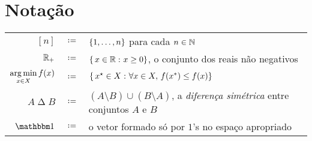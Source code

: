 \documentclass[10pt,reqno]{amsart}
\begin{document}
\appendix

\section{Notação}

\bgroup
\renewcommand{\arraystretch}{1.2}
\begin{table}[!ht]
  \centering
  \begin{tabular}{r c p{12cm} }
    \toprule
    \([n]\)
    & \(\coloneqq\) &
    \(\{1,\dotsc,n\}\) para cada \(n \in \mathbb{N}\)
    \\
    \(\mathbb{R}_+\)
    & \(\coloneqq\) &
    \(\{\,{x \in \mathbb{R}}\,\colon{x \geq 0}\}\), o conjunto dos reais não negativos
    \\
    \(\displaystyle\operatorname*{arg\,min}_{x \in X} f(x)\)
    & \(\coloneqq\) &
    \(\{\,{x^{\star} \in X}\,\colon{\forall x \in X,\,f(x^*) \leq f(x)}\}\)
    \\
    \(A \mathbin{\Delta} B\)
    & \(\coloneqq\) &
    \((A \setminus B) \cup (B \setminus A)\),
    a \emph{diferença simétrica} entre conjuntos \(A\) e \(B\)
    \\
    \(\ones\)
    & \(\coloneqq\) &
    o vetor formado só por \(1\)'s no espaço apropriado
    \\
    \bottomrule
  \end{tabular}
  \label{tbl:special-sets}
\end{table}
\egroup                         %

\nocite{CookCPS98a,Schrijver03a}

\begingroup
\printbibliography
\endgroup
\end{document}
